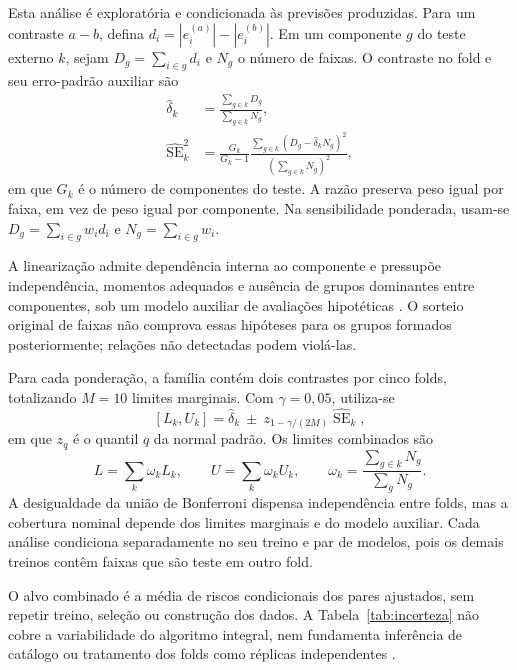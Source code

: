 Esta análise é exploratória e condicionada às previsões produzidas. Para um contraste $a-b$, defina $d_i=|e_i^{(a)}|-|e_i^{(b)}|$. Em um componente $g$ do teste externo $k$, sejam $D_g=\sum_{i\in g}d_i$ e $N_g$ o número de faixas. O contraste no fold e seu erro-padrão auxiliar são
\begin{align}
 \widehat\delta_k&=\frac{\sum_{g\in k}D_g}{\sum_{g\in k}N_g},\label{eq:deltafold}\\
 \widehat{\operatorname{SE}}_k^2&=
 \frac{G_k}{G_k-1}\frac{\sum_{g\in k}(D_g-\widehat\delta_k N_g)^2}
 {(\sum_{g\in k}N_g)^2},\label{eq:sefold}
\end{align}
em que $G_k$ é o número de componentes do teste. A razão preserva peso igual por faixa, em vez de peso igual por componente. Na sensibilidade ponderada, usam-se $D_g=\sum_{i\in g}w_i d_i$ e $N_g=\sum_{i\in g}w_i$.

A linearização admite dependência interna ao componente e pressupõe independência, momentos adequados e ausência de grupos dominantes entre componentes, sob um modelo auxiliar de avaliações hipotéticas \cite{cameron2015}. O sorteio original de faixas não comprova essas hipóteses para os grupos formados posteriormente; relações não detectadas podem violá-las.

Para cada ponderação, a família contém dois contrastes por cinco folds, totalizando $M=10$ limites marginais. Com $\gamma=0,05$, utiliza-se
\begin{equation}\label{eq:bonferroni}
 [L_k,U_k]=\widehat\delta_k\ \pm\
 z_{1-\gamma/(2M)}\widehat{\operatorname{SE}}_k,
\end{equation}
em que $z_q$ é o quantil $q$ da normal padrão. Os limites combinados são
\begin{equation}\label{eq:combinacaolimites}
 L=\sum_k\omega_kL_k,\qquad U=\sum_k\omega_kU_k,
 \qquad\omega_k=\frac{\sum_{g\in k}N_g}{\sum_gN_g}.
\end{equation}
A desigualdade da união de Bonferroni dispensa independência entre folds, mas a cobertura nominal depende dos limites marginais e do modelo auxiliar. Cada análise condiciona separadamente no seu treino e par de modelos, pois os demais treinos contêm faixas que são teste em outro fold.

O alvo combinado é a média de riscos condicionais dos pares ajustados, sem repetir treino, seleção ou construção dos dados. A Tabela~\ref{tab:incerteza} não cobre a variabilidade do algoritmo integral, nem fundamenta inferência de catálogo ou tratamento dos folds como réplicas independentes \cite{bengio2004,bates2024}.
